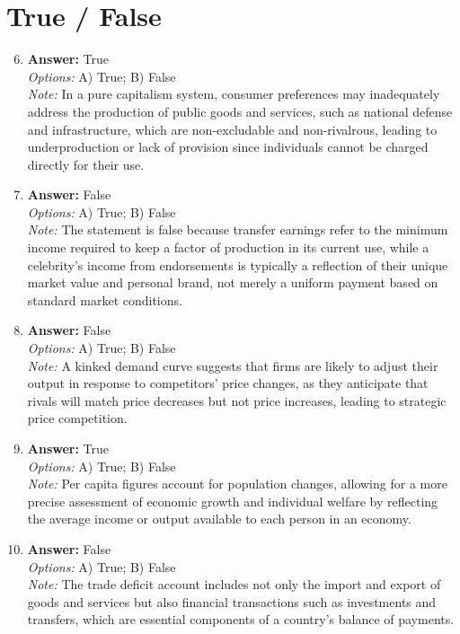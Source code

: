 \documentclass[12pt]{article}
\begin{document}
\section*{True / False}
\begin{enumerate}[label=\arabic*.]
\setcounter{enumi}{5}
\item \textbf{Answer:} True
\\ \textit{Options:} A) True; B) False
\\ \textit{Note:} In a pure capitalism system, consumer preferences may inadequately address the production of public goods and services, such as national defense and infrastructure, which are non-excludable and non-rivalrous, leading to underproduction or lack of provision since individuals cannot be charged directly for their use.
\item \textbf{Answer:} False
\\ \textit{Options:} A) True; B) False
\\ \textit{Note:} The statement is false because transfer earnings refer to the minimum income required to keep a factor of production in its current use, while a celebrity's income from endorsements is typically a reflection of their unique market value and personal brand, not merely a uniform payment based on standard market conditions.
\item \textbf{Answer:} False
\\ \textit{Options:} A) True; B) False
\\ \textit{Note:} A kinked demand curve suggests that firms are likely to adjust their output in response to competitors' price changes, as they anticipate that rivals will match price decreases but not price increases, leading to strategic price competition.
\item \textbf{Answer:} True
\\ \textit{Options:} A) True; B) False
\\ \textit{Note:} Per capita figures account for population changes, allowing for a more precise assessment of economic growth and individual welfare by reflecting the average income or output available to each person in an economy.
\item \textbf{Answer:} False
\\ \textit{Options:} A) True; B) False
\\ \textit{Note:} The trade deficit account includes not only the import and export of goods and services but also financial transactions such as investments and transfers, which are essential components of a country's balance of payments.
\end{enumerate}
\end{document}
